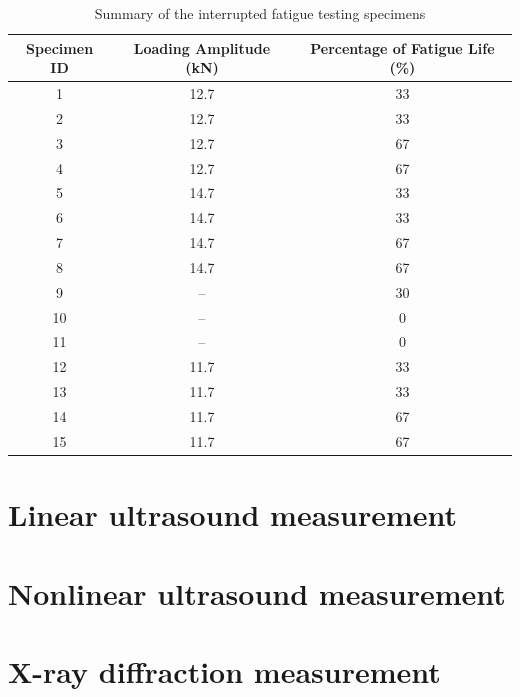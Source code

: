 \begin{table}[tb]
  \centering
  \caption{Summary of the interrupted fatigue testing specimens}
  \label{table: interrupted specimens}
  \begin{tabular}{c|c|c}\hline\hline
    Specimen ID&Loading Amplitude (kN)&Percentage of Fatigue Life (\%)\\\hline
    1&12.7&33\\
    2&12.7&33\\
    3&12.7&67\\
    4&12.7&67\\
    5&14.7&33\\
    6&14.7&33\\
    7&14.7&67\\
    8&14.7&67\\
    9&--&30\\
    10&--&0\\
    11&--&0\\
    12&11.7&33\\
    13&11.7&33\\
    14&11.7&67\\
    15&11.7&67\\\hline
  \end{tabular}
\end{table}

\section{Linear ultrasound measurement}
\section{Nonlinear ultrasound measurement}
\section{X-ray diffraction measurement}
